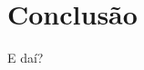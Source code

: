 \documentclass[12pt, %
openright, 
oneside, %
a4paper,    %
brazil]{facom-ufu-abntex2}
\begin{document}

\chapter[Conclusão]{Conclusão}
E daí?





\postextual













\end{document}
